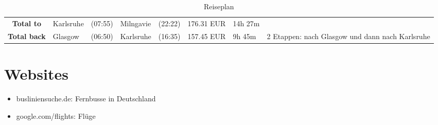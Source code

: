 \documentclass[a4paper, landscape]{scrartcl}
\begin{document}
\begin{table}[ht]
\begin{tabular}{cl p{2cm} l p{2cm} rl p{5cm}}
    \textbf{Total to}   & Karlsruhe       & (07:55)          & Milngavie                & (22:22)        &   176.31 EUR   &14h 27m & \\
    \textbf{Total back} & Glasgow         & (06:50)          & Karlsruhe                & (16:35)        &   157.45 EUR   & 9h 45m & 2 Etappen: nach Glasgow und dann nach Karlsruhe\\
        \bottomrule
        \end{tabular}
        \caption{Reiseplan}
        \label{table:reiseplan}
    \end{table}
\vfill %

\section*{Websites}

\begin{itemize}
    \item busliniensuche.de: Fernbusse in Deutschland
    \item google.com/flights: Flüge
\end{itemize}
\end{document}
